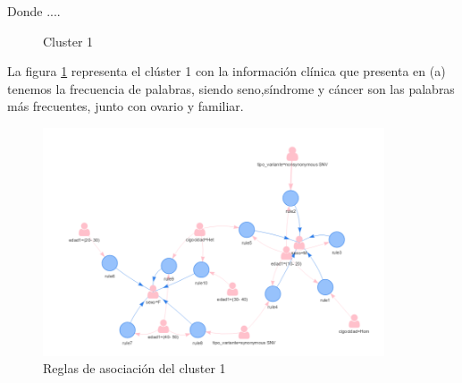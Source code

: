 Donde ....

\begin{figure}[H]
	\centering
	\caption{Cluster 1} \label{fig:c1}
\end{figure}

La figura \ref{fig:c1} representa el clúster 1 con la información clínica que presenta en (a) tenemos la frecuencia de palabras, siendo seno,síndrome y cáncer son las palabras más frecuentes, junto con ovario y familiar.

\begin{figure}[H]
	\centering
	\includegraphics[width=0.9\textwidth]{Kap4/reglasc1}
	\caption{Reglas de asociación del cluster 1} \label{fig:reglas}
\end{figure}

